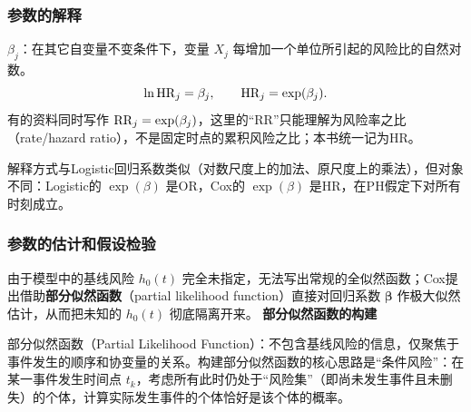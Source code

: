 \subsubsection{参数的解释}
$\beta_j$：在其它自变量不变条件下，变量 $X_j$ 每增加一个单位所引起的风险比的自然对数。
\[
\ln\operatorname{HR}_j=\beta_j,\qquad\operatorname{HR}_j=\exp(\beta_j).
\]
有的资料同时写作 $\operatorname{RR}_j=\exp(\beta_j)$，这里的“RR”只能理解为风险率之比（rate/hazard ratio），不是固定时点的累积风险之比；本书统一记为HR。
\begin{annotation}解释方式与Logistic回归系数类似（对数尺度上的加法、原尺度上的乘法），但对象不同：Logistic的 $\exp(\beta)$ 是OR，Cox的 $\exp(\beta)$ 是HR，在PH假定下对所有时刻成立。\end{annotation}
\subsubsection{参数的估计和假设检验}
由于模型中的基线风险 $h_0(t)$ 完全未指定，无法写出常规的全似然函数；Cox提出借助\textbf{部分似然函数}（partial likelihood function）直接对回归系数 $\bm\beta$ 作极大似然估计，从而把未知的 $h_0(t)$ 彻底隔离开来。
\textbf{部分似然函数的构建}

部分似然函数（Partial Likelihood Function）：不包含基线风险的信息，仅聚焦于事件发生的顺序和协变量的关系。构建部分似然函数的核心思路是“条件风险”：在某一事件发生时间点 $t_k$，考虑所有此时仍处于“风险集”（即尚未发生事件且未删失）的个体，计算实际发生事件的个体恰好是该个体的概率。


